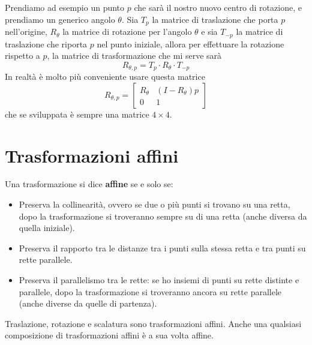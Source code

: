 Prendiamo ad esempio un punto $p$ che sar\`a il nostro nuovo centro di rotazione, e prendiamo
un generico angolo $\theta$. Sia $T_p$ la matrice di traslazione che porta $p$ nell'origine,
$R_\theta$ la matrice di rotazione per l'angolo $\theta$ e sia $T_{-p}$ la matrice di
traslazione che riporta $p$ nel punto iniziale, allora per effettuare la rotazione rispetto
a $p$, la matrice di trasformazione che mi serve sar\`a
\[ R_{\theta, p} = T_p \cdot R_\theta \cdot T_{-p} \]
In realt\`a \`e molto pi\`u conveniente usare questa matrice
\[
	R_{\theta, p} = \begin{bmatrix}
		R_\theta & (I - R_\theta) p \\
		0        & 1
	\end{bmatrix}
\]
che se sviluppata \`e sempre una matrice $4 \times 4$.

\section{Trasformazioni affini}
Una trasformazione si dice \textbf{affine} se e solo se:
\begin{itemize}
	\item Preserva la collinearit\`a, ovvero se due o pi\`u punti si trovano su una retta,
	      dopo la trasformazione si troveranno sempre su di una retta (anche diversa da
	      quella iniziale).
	\item Preserva il rapporto tra le distanze tra i punti sulla stessa retta e tra punti su
	      rette parallele.
	\item Preserva il parallelismo tra le rette: se ho insiemi di punti su rette distinte e
	      parallele, dopo la trasformazione si troveranno ancora su rette parallele (anche
	      diverse da quelle di partenza).
\end{itemize}
Traslazione, rotazione e scalatura sono trasformazioni affini. Anche una qualsiasi
composizione di trasformazioni affini \`e a sua volta affine.

